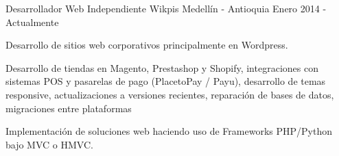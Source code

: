 \begin{cventries}
  \cventry
    {Desarrollador Web Independiente} %
    {Wikpis} %
    {Medellín - Antioquia} %
    {Enero 2014 - Actualmente} %
    {
      \begin{cvitems} %
		\item {Desarrollo de sitios web corporativos principalmente en Wordpress.}
		\item {Desarrollo de tiendas en Magento, Prestashop y Shopify, integraciones con sistemas POS y pasarelas de pago (PlacetoPay / Payu), desarrollo de temas responsive, actualizaciones a versiones recientes, reparación de bases de datos, migraciones entre plataformas}
		\item {Implementación de soluciones web haciendo uso de Frameworks PHP/Python bajo MVC o HMVC.}
      \end{cvitems}
    }

\end{cventries}

